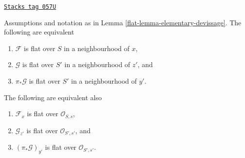 \begin{lemma}
\label{flat-lemma-devissage-flat}
\href{https://stacks.math.columbia.edu/tag/057U}{\texttt{Stacks tag 057U}}

Assumptions and notation as in
Lemma \ref{flat-lemma-elementary-devissage}.
The following are equivalent
\begin{enumerate}
\item $\mathcal{F}$ is flat over $S$ in a neighbourhood of $x$,
\item $\mathcal{G}$ is flat over $S'$ in a neighbourhood of $z'$, and
\item $\pi_*\mathcal{G}$ is flat over $S'$ in a neighbourhood of $y'$.
\end{enumerate}
The following are equivalent also
\begin{enumerate}
\item[(a)] $\mathcal{F}_x$ is flat over $\mathcal{O}_{S, s}$,
\item[(b)] $\mathcal{G}_{z'}$ is flat over $\mathcal{O}_{S', s'}$, and
\item[(c)] $(\pi_*\mathcal{G})_{y'}$ is flat over $\mathcal{O}_{S', s'}$.
\end{enumerate}
\end{lemma}

